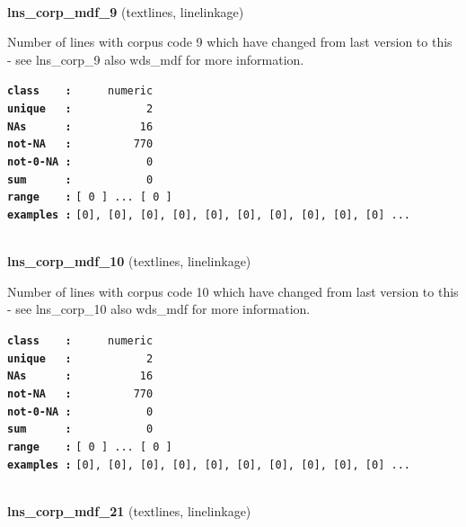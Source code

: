 \documentclass[]{article}
\begin{document}
~

\textbf{lns\_corp\_mdf\_9} (textlines, linelinkage)

Number of lines with corpus code 9 which have changed from last version
to this - see lns\_corp\_9 also wds\_mdf for more information.

\textbf{\texttt{class\ \ \ \ :}} \texttt{~~~~~numeric}\\
\textbf{\texttt{unique\ \ \ :}} \texttt{~~~~~~~~~~~2}\\
\textbf{\texttt{NAs\ \ \ \ \ \ :}} \texttt{~~~~~~~~~~16}\\
\textbf{\texttt{not-NA\ \ \ :}} \texttt{~~~~~~~~~770}\\
\textbf{\texttt{not-0-NA\ :}} \texttt{~~~~~~~~~~~0}\\
\textbf{\texttt{sum\ \ \ \ \ \ :}} \texttt{~~~~~~~~~~~0}\\
\textbf{\texttt{range\ \ \ \ :}}
\texttt{{[}\ 0\ {]}\ ...\ {[}\ 0\ {]}}\\
\textbf{\texttt{examples\ :}}
\texttt{{[}0{]},\ {[}0{]},\ {[}0{]},\ {[}0{]},\ {[}0{]},\ {[}0{]},\ {[}0{]},\ {[}0{]},\ {[}0{]},\ {[}0{]}\ ...}\\

~

\textbf{lns\_corp\_mdf\_10} (textlines, linelinkage)

Number of lines with corpus code 10 which have changed from last version
to this - see lns\_corp\_10 also wds\_mdf for more information.

\textbf{\texttt{class\ \ \ \ :}} \texttt{~~~~~numeric}\\
\textbf{\texttt{unique\ \ \ :}} \texttt{~~~~~~~~~~~2}\\
\textbf{\texttt{NAs\ \ \ \ \ \ :}} \texttt{~~~~~~~~~~16}\\
\textbf{\texttt{not-NA\ \ \ :}} \texttt{~~~~~~~~~770}\\
\textbf{\texttt{not-0-NA\ :}} \texttt{~~~~~~~~~~~0}\\
\textbf{\texttt{sum\ \ \ \ \ \ :}} \texttt{~~~~~~~~~~~0}\\
\textbf{\texttt{range\ \ \ \ :}}
\texttt{{[}\ 0\ {]}\ ...\ {[}\ 0\ {]}}\\
\textbf{\texttt{examples\ :}}
\texttt{{[}0{]},\ {[}0{]},\ {[}0{]},\ {[}0{]},\ {[}0{]},\ {[}0{]},\ {[}0{]},\ {[}0{]},\ {[}0{]},\ {[}0{]}\ ...}\\

~

\textbf{lns\_corp\_mdf\_21} (textlines, linelinkage)
\end{document}
